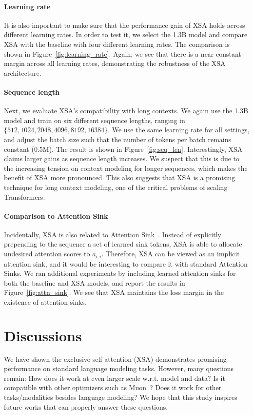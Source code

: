 \documentclass{article}
\begin{document}
\paragraph{Learning rate} It is also important to make sure that the performance gain of XSA holds across different learning rates. In order to test it, we select the 1.3B model and compare XSA with the baseline with four different learning rates. The comparison is shown in Figure~\ref{fig:learning_rate}. Again, we see that there is a near constant margin across all learning rates, demonstrating the robustness of the XSA architecture.

\paragraph{Sequence length} Next, we evaluate XSA's compatibility with long contexts. We again use the 1.3B model and train on six different sequence lengths, ranging in $\{512, 1024, 2048, 4096, 8192, 16384\}$. We use the same learning rate for all settings, and adjust the batch size such that the number of tokens per batch remains constant (0.5M). The result is shown in Figure~\ref{fig:seq_len}. Interestingly, XSA claims larger gains as sequence length increases. We suspect that this is due to the increasing tension on context modeling for longer sequences, which makes the benefit of XSA more pronounced. This also suggests that XSA is a promising technique for long context modeling, one of the critical problems of scaling Transformers. 

\paragraph{Comparison to Attention Sink} Incidentally, XSA is also related to Attention Sink~\citep{xiao2023efficient}. Instead of explicitly prepending to the sequence a set of learned sink tokens, XSA is able to allocate undesired attention scores to $a_{i,i}$. Therefore, XSA can be viewed as an implicit attention sink, and it would be interesting to compare it with standard Attention Sinks. We ran additional experiments by including learned attention sinks for both the baseline and XSA models, and report the results in Figure~\ref{fig:attn_sink}. We see that XSA maintains the loss margin in the existence of attention sinks.

\section{Discussions}
We have shown the exclusive self attention (XSA) demonstrates promising performance on standard language modeling tasks. However, many questions remain: How does it work at even larger scale w.r.t. model and data? Is it compatible with other optimizers such as Muon~\citep{jordan2024muon}? Does it work for other tasks/modalities besides language modeling? We hope that this study inspires future works that can properly answer these questions. 



\end{document}

